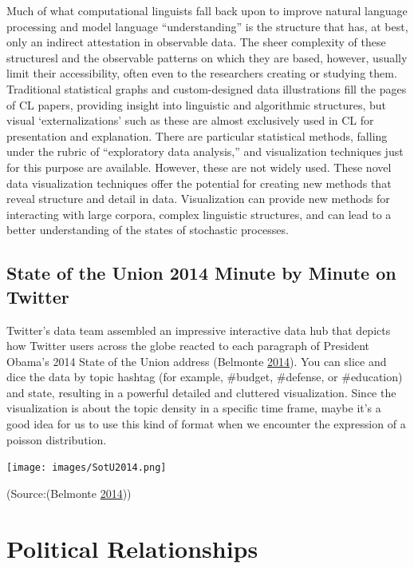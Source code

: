 \documentclass[]{book}
\begin{document}
Much of what computational linguists fall back upon to improve natural language processing and model language ``understanding'' is the structure that has, at best, only an indirect attestation in observable data. The sheer complexity of these structuresl and the observable patterns on which they are based, however, usually limit their accessibility, often even to the researchers creating or studying them. Traditional statistical graphs and custom-designed data illustrations fill the pages of CL papers, providing insight into linguistic and algorithmic structures, but visual `externalizations' such as these are almost exclusively used in CL for presentation and explanation. There are particular statistical methods, falling under the rubric of ``exploratory data analysis,'' and visualization techniques just for this purpose are available. However, these are not widely used. These novel data visualization techniques offer the potential for creating new methods that reveal structure and detail in data. Visualization can provide new methods for interacting with large corpora, complex linguistic structures, and can lead to a better understanding of the states of stochastic processes.

\hypertarget{state-of-the-union-2014-minute-by-minute-on-twitter}{%
\subsection{State of the Union 2014 Minute by Minute on Twitter}\label{state-of-the-union-2014-minute-by-minute-on-twitter}}

Twitter's data team assembled an impressive interactive data hub that depicts how Twitter users across the globe reacted to each paragraph of President Obama's 2014 State of the Union address (Belmonte \protect\hyperlink{ref-SotU2014}{2014}). You can slice and dice the data by topic hashtag (for example, \#budget, \#defense, or \#education) and state, resulting in a powerful detailed and cluttered visualization. Since the visualization is about the topic density in a specific time frame, maybe it's a good idea for us to use this kind of format when we encounter the expression of a poisson distribution.

\texttt{[image: images/SotU2014.png]}

(Source:(Belmonte \protect\hyperlink{ref-SotU2014}{2014}))

\hypertarget{political-relationships}{%
\section{Political Relationships}\label{political-relationships}}
\end{document}
